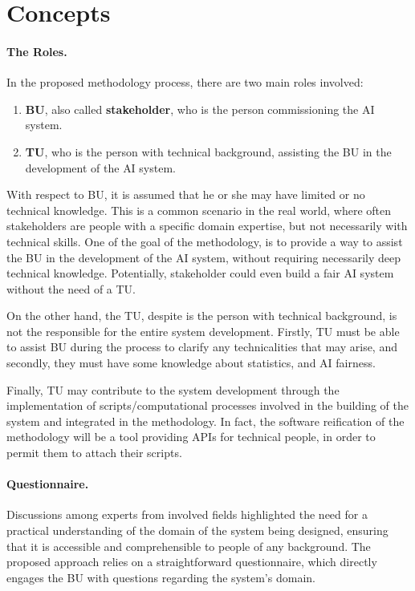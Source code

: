 \documentclass[12pt,a4paper,openright,twoside]{book}
\begin{document}
\section{Concepts}

\paragraph{The Roles.}
In the proposed methodology process, there are two main roles involved:
\begin{enumerate}
    \item \textbf{\ac{BU}}, 
    also called \textbf{stakeholder}, 
    who is the person commissioning the \ac{AI} system.
    \item \textbf{\ac{TU}}, who is the person with technical background, assisting the \ac{BU} in the development of the \ac{AI} system.
\end{enumerate}

With respect to \ac{BU}, it is assumed that he or she may have limited or no technical knowledge.
%
This is a common scenario in the real world, where often stakeholders are people with a specific domain expertise, but not necessarily with technical skills.
%
One of the goal of the methodology, is to provide a way to assist the \ac{BU} in the development of the \ac{AI} system, without requiring necessarily deep technical knowledge.
%
Potentially, stakeholder could even build a fair \ac{AI} system without the need of a \ac{TU}.

On the other hand, the \acl{TU}, despite is the person with technical background, is not the responsible for the entire system development.
%
Firstly, \ac{TU} must be able to assist \ac{BU} during the process to clarify any technicalities that may arise, and secondly, 
they must have some knowledge about statistics, and \ac{AI} fairness.

Finally, \ac{TU} may contribute to the system development through the implementation of scripts/computational processes involved in the building of the system and integrated in the methodology.
%
In fact, the software reification of the methodology will be a tool providing \acp{API} for technical people, in order to permit them to attach their scripts.


\paragraph{Questionnaire.}
Discussions among experts from involved fields highlighted the need for a practical understanding of the domain of the system being designed, ensuring that it is accessible and comprehensible to people of any background.
%
The proposed approach relies on a straightforward questionnaire, which directly engages the \acl{BU} with questions regarding the system's domain.
\end{document}
